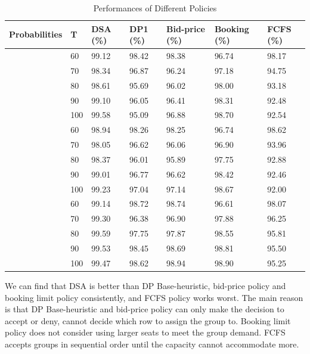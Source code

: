 \begin{table}[ht]
  \centering
  \caption{Performances of Different Policies}
  \begin{tabular}{|l|l|l|l|l|l|l|}
  \hline
  Probabilities &  T &  DSA (\%) & DP1 (\%) & Bid-price (\%) & Booking (\%) & FCFS (\%) \\
  \hline
  [0.25,0.25,0.25,0.25] & 60  &  99.12 & 98.42 & 98.38 & 96.74 & 98.17 \\
  & 70                             & 98.34 & 96.87 & 96.24 & 97.18 & 94.75 \\
  & 80                             & 98.61 & 95.69 & 96.02 & 98.00 & 93.18 \\
  & 90                             & 99.10 & 96.05 & 96.41 & 98.31 & 92.48 \\
  & 100                            & 99.58 & 95.09 & 96.88 & 98.70 & 92.54 \\
   \hline
  [0.25, 0.35, 0.05, 0.35] & 60  &  98.94 & 98.26 & 98.25 & 96.74 & 98.62 \\
  & 70                           & 98.05 & 96.62 & 96.06 & 96.90 & 93.96 \\
  & 80                           & 98.37 & 96.01 & 95.89 & 97.75 & 92.88 \\
  & 90                           & 99.01 & 96.77 & 96.62 & 98.42 & 92.46 \\
  & 100                          & 99.23 & 97.04 & 97.14 & 98.67 & 92.00 \\
  \hline
  [0.15, 0.25, 0.55, 0.05] & 60  &  99.14 & 98.72 & 98.74 & 96.61 & 98.07 \\
  & 70                             & 99.30 & 96.38 & 96.90 & 97.88 & 96.25 \\
  & 80                             & 99.59 & 97.75 & 97.87 & 98.55 & 95.81 \\
  & 90                             & 99.53 & 98.45 & 98.69 & 98.81 & 95.50 \\
  & 100                            & 99.47 & 98.62 & 98.94 & 98.90 & 95.25 \\
  \hline
  \end{tabular}
\end{table}

We can find that DSA is better than DP Base-heuristic, bid-price policy and booking limit policy consistently, and FCFS policy works worst. The main reason is that DP Base-heuristic and bid-price policy can only make the decision to accept or deny, cannot decide which row to assign the group to. Booking limit policy does not consider using larger seats to meet the group demand. FCFS accepts groups in sequential order until the capacity cannot accommodate more.

